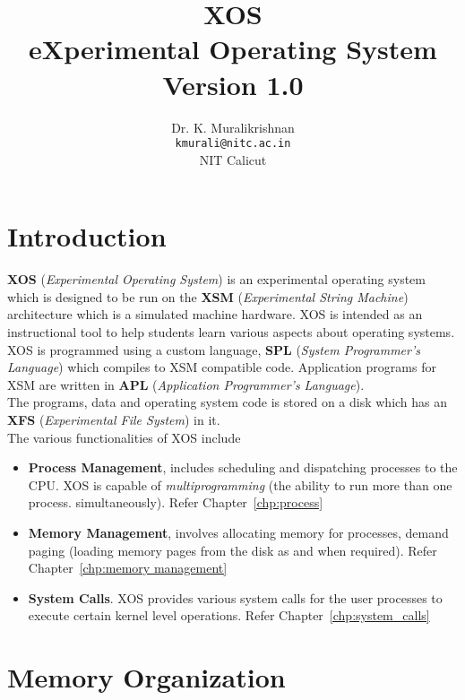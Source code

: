 \documentclass[10pt]{report}
\title{XOS \\ eXperimental Operating System \\
Version 1.0}
\author{Dr. K. Muralikrishnan  \\ \texttt{kmurali@nitc.ac.in} \\ {NIT Calicut} }
\begin{document}
\maketitle
\pagebreak

\thispagestyle{plain}

\tableofcontents
\pagebreak

\chapter{Introduction}
\label{chp:osintro}
\textbf{XOS} (\textit{Experimental Operating System}) is an experimental operating system which is designed to be run on the \textbf{XSM} (\textit{Experimental String Machine}) architecture which is a simulated machine hardware. XOS is intended as an instructional tool to help students learn various aspects about operating systems.
\vspace{0.1in} \\
XOS is programmed using a custom language, \textbf{SPL} (\textit{System Programmer's Language}) which compiles to XSM compatible code. Application programs for XSM are written in \textbf{APL} (\textit{Application Programmer's Language}). 
\vspace{0.1in} \\
The programs, data and operating system code is stored on a disk which has an \textbf{XFS} (\textit{Experimental File System}) in it. \\

The various functionalities of XOS include
\begin{itemize}
\item \textbf{Process Management}, includes scheduling and dispatching processes to the CPU. XOS is capable of \textit{multiprogramming} (the ability to run more than one process.  simultaneously). Refer Chapter~\ref{chp:process}
\item \textbf{Memory Management}, involves allocating memory for processes, demand paging (loading memory pages from the disk as and when required). Refer Chapter~\ref{chp:memory management}
\item \textbf{System Calls}. XOS provides various system calls for the user processes to execute certain kernel level operations. Refer Chapter~\ref{chp:system_calls}
\end{itemize} 


\chapter{Memory Organization}
\label{chp:memoryorg}
\end{document}
